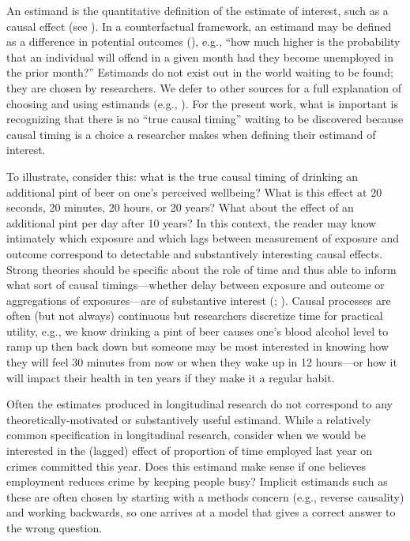 \documentclass[
  letterpaper,
  DIV=11,
  numbers=noendperiod]{scrartcl}
\begin{document}
An estimand is the quantitative definition of the estimate of interest,
such as a causal effect (see ). In a counterfactual framework, an estimand
may be defined as a difference in potential outcomes
(),
e.g., ``how much higher is the probability that an individual will
offend in a given month had they become unemployed in the prior month?''
Estimands do not exist out in the world waiting to be found; they are
chosen by researchers. We defer to other sources for a full explanation
of choosing and using estimands (e.g.,
).
For the present work, what is important is recognizing that there is no
``true causal timing'' waiting to be discovered because causal timing is
a choice a researcher makes when defining their estimand of interest.

To illustrate, consider this: what is the true causal timing of drinking
an additional pint of beer on one's perceived wellbeing? What is this
effect at 20 seconds, 20 minutes, 20 hours, or 20 years? What about the
effect of an additional pint per day after 10 years? In this context,
the reader may know intimately which exposure and which lags between
measurement of exposure and outcome correspond to detectable and
substantively interesting causal effects. Strong theories should be
specific about the role of time and thus able to inform what sort of
causal timings---whether delay between exposure and outcome or
aggregations of exposures---are of substantive interest
(;
). Causal processes
are often (but not always) continuous but researchers discretize time
for practical utility, e.g., we know drinking a pint of beer causes
one's blood alcohol level to ramp up then back down but someone may be
most interested in knowing how they will feel 30 minutes from now or
when they wake up in 12 hours---or how it will impact their health in
ten years if they make it a regular habit.

Often the estimates produced in longitudinal research do not correspond
to any theoretically-motivated or substantively useful estimand. While a
relatively common specification in longitudinal research, consider when
we would be interested in the (lagged) effect of proportion of time
employed last year on crimes committed this year. Does this estimand
make sense if one believes employment reduces crime by keeping people
busy? Implicit estimands such as these are often chosen by starting with
a methods concern (e.g., reverse causality) and working backwards, so
one arrives at a model that gives a correct answer to the wrong
question.
\end{document}
